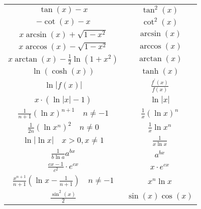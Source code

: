 \begin{center}
\begin{center}
\begin{tabular}{c||c}
          $\tan (x)-x$ & $\tan ^{2}(x)$ \\
         $-\cot (x)-x$ & $\cot ^{2}(x)$ \\
         $x \arcsin (x)+\sqrt{1-x^{2}}$ & $\arcsin (x)$ \\
         $x \arccos (x)-\sqrt{1-x^{2}}$ & $\arccos (x)$ \\
         $x \arctan (x)-\frac{1}{2} \ln \left(1+x^{2}\right)$ & $\arctan (x)$ \\
          $\ln (\cosh (x))$ & $\tanh (x)$ \\
          $\ln |f(x)|$ & $\frac{f^{\prime}(x)}{f(x)}$ \\
         $x \cdot(\ln |x|-1)$ & $\ln |x|$ \\
         $\frac{1}{n+1}(\ln x)^{n+1} \quad n \neq-1$ & $\frac{1}{x}(\ln x)^{n}$ \\
         $\frac{1}{2 n}\left(\ln x^{n}\right)^{2} \quad n \neq 0$ & $\frac{1}{x} \ln x^{n}$ \\
          $\ln |\ln x| \quad x>0, x \neq 1$ & $\frac{1}{x \ln x}$ \\
         $\frac{1}{b \ln a} a^{b x}$ & $a^{b x}$ \\
         $\frac{c x-1}{c^{2}} \cdot e^{c x}$ & $x \cdot e^{c x}$ \\
         $\frac{x^{n+1}}{n+1}\left(\ln x-\frac{1}{n+1}\right) \quad n \neq-1$ & $x^{n} \ln x$ \\
        $\frac{\sin ^{2}(x)}{2}$ &
        $\sin (x) \cos (x)$ \\
        \hline
        \end{tabular}
    

\end{center}
\end{center}
